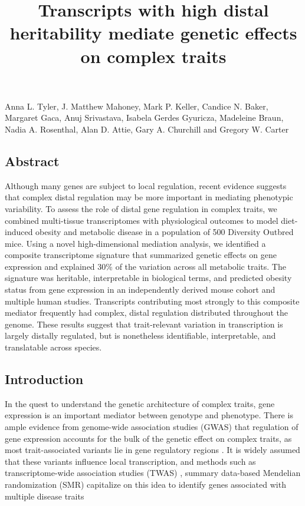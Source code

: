 \documentclass[
]{article}
\title{Transcripts with high distal heritability mediate genetic effects
on complex traits}
\author{}
\date{\vspace{-2.5em}}
\begin{document}
\maketitle

Anna L. Tyler, J. Matthew Mahoney, Mark P. Keller, Candice N. Baker,
Margaret Gaca, Anuj Srivastava, Isabela Gerdes Gyuricza, Madeleine
Braun, Nadia A. Rosenthal, Alan D. Attie, Gary A. Churchill and Gregory
W. Carter

\subsection{Abstract}\label{abstract}

Although many genes are subject to local regulation, recent evidence
suggests that complex distal regulation may be more important in
mediating phenotypic variability. To assess the role of distal gene
regulation in complex traits, we combined multi-tissue transcriptomes
with physiological outcomes to model diet-induced obesity and metabolic
disease in a population of 500 Diversity Outbred mice. Using a novel
high-dimensional mediation analysis, we identified a composite
transcriptome signature that summarized genetic effects on gene
expression and explained 30\% of the variation across all metabolic
traits. The signature was heritable, interpretable in biological terms,
and predicted obesity status from gene expression in an independently
derived mouse cohort and multiple human studies. Transcripts
contributing most strongly to this composite mediator frequently had
complex, distal regulation distributed throughout the genome. These
results suggest that trait-relevant variation in transcription is
largely distally regulated, but is nonetheless identifiable,
interpretable, and translatable across species.

\subsection{Introduction}\label{introduction}

In the quest to understand the genetic architecture of complex traits,
gene expression is an important mediator between genotype and phenotype.
There is ample evidence from genome-wide association studies (GWAS) that
regulation of gene expression accounts for the bulk of the genetic
effect on complex traits, as most trait-associated variants lie in gene
regulatory regions \cite{pmid22955828, 
pmid25363779, pmid21617055, pmid19474294, pmid24702953, 
pmid24316577, pmid27126046}. It is widely assumed that these variants
influence local transcription, and methods such as transcriptome-wide
association studies (TWAS)
\cite{pmid33020666, pmid26258848, pmid27019110, pmid26854917}, summary
data-based Mendelian randomization (SMR) \cite{pmid27019110} capitalize
on this idea to identify genes associated with multiple disease traits
\cite{pmid29567659, pmid35533209, 
pmid27309819, pmid30950127}
\end{document}
